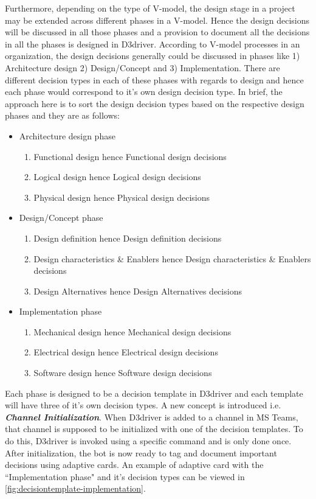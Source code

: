 Furthermore, depending on the type of V-model, the design stage in a project may be extended across different phases in a V-model.  Hence the design decisions will be discussed in all those phases and a provision to document all the decisions in all the phases is designed in D3driver. According to V-model processes in an organization, the design decisions generally could be discussed in phases like 1) Architecture design 2) Design/Concept and 3) Implementation. There are different decision types in each of these phases with regards to design and hence each phase would correspond to it’s own design decision type. In brief, the approach here is to sort the design decision types based on the respective design phases and they are as follows:
\begin{itemize}
\item Architecture design phase
\begin{enumerate}
\item Functional design hence Functional design decisions
\item Logical design hence Logical design decisions
\item Physical design hence Physical design decisions
\end{enumerate}
\item Design/Concept phase
\begin{enumerate}
\item Design definition hence Design definition decisions
\item Design characteristics \& Enablers hence Design characteristics \& Enablers decisions
\item Design Alternatives hence Design Alternatives decisions
\end{enumerate}
\item Implementation phase
\begin{enumerate}
\item Mechanical design hence Mechanical design decisions
\item Electrical design hence Electrical design decisions
\item Software design hence Software design decisions
\end{enumerate}
\end{itemize}

Each phase is designed to be a decision template in D3driver and each template will have three of it's own decision types. A new concept is introduced i.e. \textit{\textbf{Channel Initialization}}. When D3driver is added to a channel in MS Teams, that channel is supposed to be initialized with one of the decision templates. To do this, D3driver is invoked using a specific command and is only done once. After initialization, the bot is now ready to tag and document important decisions using adaptive cards. An example of adaptive card with the ``Implementation phase" and it's decision types can be viewed in \ref{fig:decisiontemplate-implementation}.

